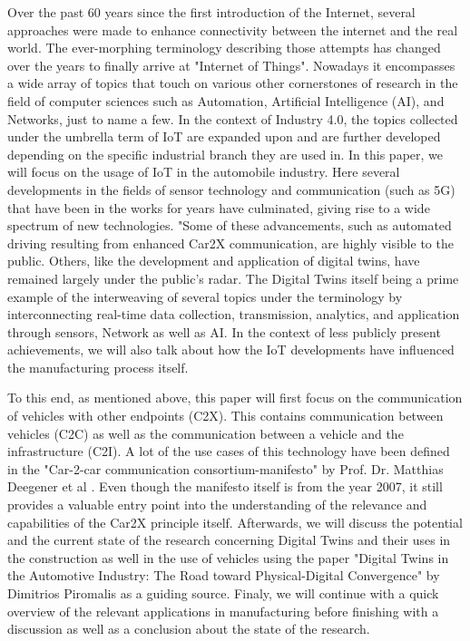 Over the past 60 years since the first introduction of the Internet, several approaches were made to enhance connectivity between the internet and the real world. The ever-morphing terminology describing those attempts has changed over the years to finally arrive at "Internet of Things". Nowadays it encompasses a wide array of topics that touch on various other cornerstones of research in the field of computer sciences such as Automation, Artificial Intelligence (AI), and Networks, just to name a few. In the context of Industry 4.0, the topics collected under the umbrella term of IoT are expanded upon and are further developed depending on the specific industrial branch they are used in. In this paper, we will focus on the usage of IoT in the automobile industry. Here several developments in the fields of sensor technology and communication (such as 5G) that have been in the works for years have culminated, giving rise to a wide spectrum of new technologies. "Some of these advancements, such as automated driving resulting from enhanced Car2X communication, are highly visible to the public. Others, like the development and application of digital twins, have remained largely under the public's radar. The Digital Twins itself being a prime example of the interweaving of several topics under the terminology by interconnecting real-time data collection, transmission, analytics, and application through sensors, Network as well as AI. In the context of less publicly present achievements, we will also talk about how the IoT developments have influenced the manufacturing process itself.

To this end, as mentioned above, this paper will first focus on the communication of vehicles with other endpoints (C2X). This contains communication between vehicles (C2C) as well as the communication between a vehicle and the infrastructure (C2I). A lot of the use cases of this technology have been defined in the "Car-2-car communication consortium-manifesto" by Prof. Dr. Matthias Deegener et al \cite{baldessari2007car}. Even though the manifesto itself is from the year 2007, it still provides a valuable entry point into the understanding of the relevance and capabilities of the Car2X principle itself. Afterwards, we will discuss the potential and the current state of the research concerning Digital Twins and their uses in the construction as well in the use of vehicles using the paper "Digital Twins in the Automotive Industry: The Road toward Physical-Digital Convergence" by Dimitrios Piromalis \cite{piromalis2022digital} as a guiding source. Finaly, we will continue with a quick overview of the relevant applications in manufacturing before finishing with a discussion as well as a conclusion about the state of the research.